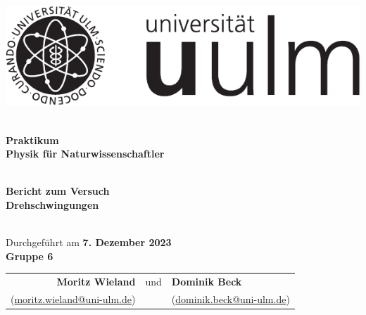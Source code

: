 \documentclass[11pt]{betterallrounder}
\begin{document}
\begin{titlepage}

    \begin{center}

        \begin{minipage}{\textwidth}
            \begin{center}
                \includegraphics{bilder/Logo_uulm_Vorlage_100mm_schwarz.pdf}
            \end{center}
        \end{minipage}
    
        \textsc{\Large }\\[1.5cm]
        
        {\huge \bfseries Praktikum\\[0.5cm]}
        {\huge \bfseries Physik für Naturwissenschaftler}

        \textsc{\Large }\\[1.5cm]

        {\large \bfseries Bericht zum Versuch}\\[0.5cm]
        
        {\huge \bfseries Drehschwingungen\\[0.4cm]}

        \textsc{\Large }\\[1.5cm]

        {\large Durchgeführt am \bfseries{7. Dezember 2023}}\\[1cm]
        
        {\huge \bfseries Gruppe 6\\[0.4cm]}

        \Large
        \begin{tabular}{rcl}
            \bfseries{Moritz Wieland} & und & \bfseries{Dominik Beck}\\
            (\href{mailto:moritz.wieland@uni-ulm.de}{moritz.wieland@uni-ulm.de}) & & (\href{mailto:dominik.beck@uni-ulm.de}{dominik.beck@uni-ulm.de})
        \end{tabular}

        \textsc{\huge }\\[1cm]


\end{center}
\end{titlepage}
\end{document}
